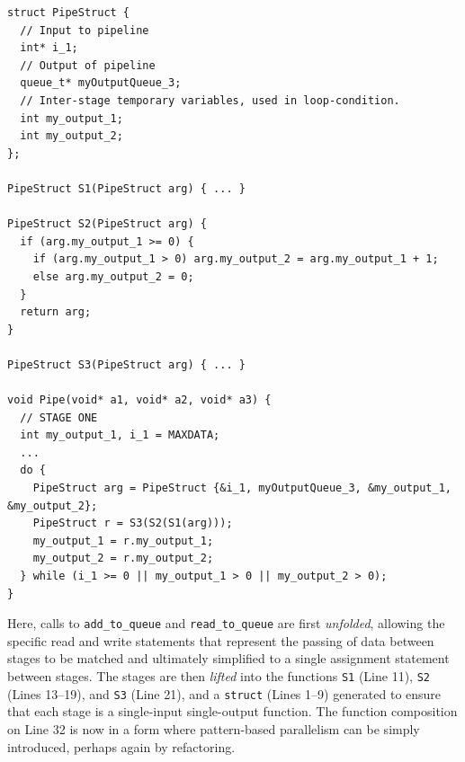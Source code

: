 \begin{lstlisting}[caption=Clean Sequential Simple Pipeline Code, frame=single, label=lst:pipeClean]
struct PipeStruct {
  // Input to pipeline
  int* i_1;
  // Output of pipeline
  queue_t* myOutputQueue_3;
  // Inter-stage temporary variables, used in loop-condition.
  int my_output_1;
  int my_output_2;
};

PipeStruct S1(PipeStruct arg) { ... }

PipeStruct S2(PipeStruct arg) {
  if (arg.my_output_1 >= 0) {
    if (arg.my_output_1 > 0) arg.my_output_2 = arg.my_output_1 + 1;
    else arg.my_output_2 = 0;
  }
  return arg;
}

PipeStruct S3(PipeStruct arg) { ... }

void Pipe(void* a1, void* a2, void* a3) {
  // STAGE ONE
  int my_output_1, i_1 = MAXDATA;
  ...
  do {
    PipeStruct arg = PipeStruct {&i_1, myOutputQueue_3, &my_output_1, &my_output_2};
    PipeStruct r = S3(S2(S1(arg)));
    my_output_1 = r.my_output_1;
    my_output_2 = r.my_output_2;
  } while (i_1 >= 0 || my_output_1 > 0 || my_output_2 > 0);
}
\end{lstlisting}

\noindent
Here, calls to \lstinline|add_to_queue| and \lstinline|read_to_queue| are first \emph{unfolded}, allowing the specific read and write statements that represent the passing of data between stages to be matched and ultimately simplified to a single assignment statement between stages. The stages are then \emph{lifted} into the functions \lstinline|S1| (Line 11), \lstinline|S2| (Lines 13--19), and \lstinline|S3| (Line 21), and a \lstinline|struct| (Lines 1--9) generated to ensure that each stage is a single-input single-output function. The function composition on Line 32 is now in a form where pattern-based parallelism can be simply introduced, perhaps again by refactoring.



